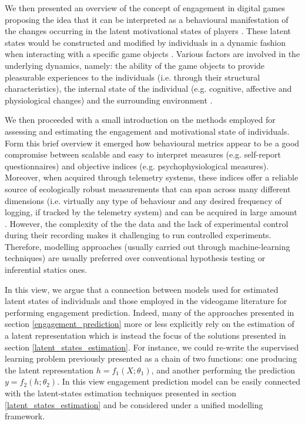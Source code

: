 We then presented an overview of the concept of engagement in digital games proposing the idea that it can be interpreted as a behavioural manifestation of the changes occurring in the latent motivational states of players \cite{o2008user,berridge2004motivation}. These latent states would be constructed and modified by individuals in a dynamic fashion when interacting with a specific game objects \cite{o2008user,berridge2004motivation}. Various factors are involved in the underlying dynamics, namely: the ability of the game objects to provide pleasurable experiences to the individuals (i.e. through their structural characteristics), the internal state of the individual (e.g. cognitive, affective and physiological changes) and the surrounding environment \cite{lucas2004sex,o2008user,jennett2008measuring,boyle2012engagement,connolly2012systematic,berridge2004motivation,csikszentmihalyi2014toward}. 

We then proceeded with a small introduction on the methods employed for assessing and estimating the engagement and motivational state of individuals. Form this brief overview it emerged how behavioural metrics appear to be a good compromise between scalable and easy to interpret measures (e.g. self-report questionnaires) and objective indices (e.g. psychophysiological measures). Moreover, when acquired through telemetry systems, these indices offer a reliable source of ecologically robust measurements that can span across many different dimensions (i.e. virtually any type of behaviour and any desired frequency of logging, if tracked by the telemetry system) and can be acquired in large amount \cite{el2016game}. However, the complexity of the the data and the lack of experimental control during their recording makes it challenging to run controlled experiments. Therefore, modelling approaches (usually carried out through machine-learning techniques) are usually preferred over conventional hypothesis testing or inferential statics ones. 

In this view, we argue that a connection between models used for estimated latent states of individuals and those employed in the videogame literature for performing engagement prediction. Indeed, many of the approaches presented in section \ref{engagement_prediction} more or less explicitly rely on the estimation of a latent representation which is instead the focus of the solutions presented in section \ref{latent_states_estimation}. For instance, we could re-write the supervised learning problem previously presented as a chain of two functions: one producing the latent representation $h = f_1(X; \theta_1)$, and another performing the prediction $y = f_2(h; \theta_2)$. In this view engagement prediction model can be easily connected with the latent-states estimation techniques presented in section \ref{latent_states_estimation} and be considered under a unified modelling framework. 

